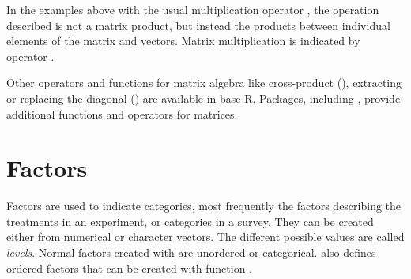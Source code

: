 \documentclass[krantz2]{krantz}\usepackage{knitr}%
\begin{document}
In the examples above with the usual multiplication operator \code{*}, the operation described is not a matrix product, but instead the products between individual elements of the matrix and vectors. Matrix multiplication is indicated by operator \Roperator{\%*\%}.

\begin{knitrout}\footnotesize
{}\color{fgcolor}
\end{knitrout}

Other operators and functions for matrix algebra like cross-product (), extracting or replacing the diagonal () are available in base R. Packages, including , provide additional functions and operators for matrices.




\section{Factors}\label{sec:calc:factors}
Factors are used to indicate categories, most frequently the factors describing the treatments in an experiment, or categories in a survey. They can be created either from numerical or character vectors. The different possible values are called \emph{levels}. Normal factors created with  are unordered or categorical. \Rlang also defines ordered factors that can be created with function .
\end{document}
